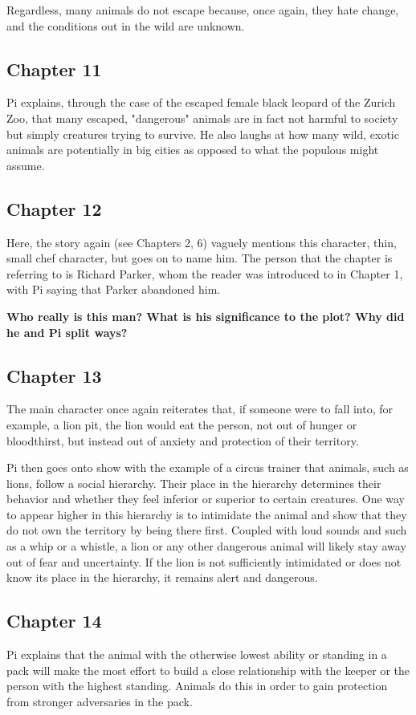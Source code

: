 \documentclass[11pt]{article}
\begin{document}
Regardless, many animals do not escape because, once again, they hate change, and the conditions out in the wild are unknown.
\subsection{Chapter 11}
\label{sec:org6f41b4b}
Pi explains, through the case of the escaped female black leopard of the Zurich Zoo, that many escaped, "dangerous" animals are in fact not harmful to society but simply creatures trying to survive. He also laughs at how many wild, exotic animals are potentially in big cities as opposed to what the populous might assume.
\subsection{Chapter 12}
\label{sec:orge7b649f}
Here, the story again (see Chapters 2, 6) vaguely mentions this character, thin, small chef character, but goes on to name him. The person that the chapter is referring to is Richard Parker, whom the reader was introduced to in Chapter 1, with Pi saying that Parker abandoned him.

\textbf{Who really is this man? What is his significance to the plot? Why did he and Pi split ways?}
\subsection{Chapter 13}
\label{sec:org1650b41}
The main character once again reiterates that, if someone were to fall into, for example, a lion pit, the lion would eat the person, not out of hunger or bloodthirst, but instead out of anxiety and protection of their territory.

Pi then goes onto show with the example of a circus trainer that animals, such as lions, follow a social hierarchy. Their place in the hierarchy determines their behavior and whether they feel inferior or superior to certain creatures. One way to appear higher in this hierarchy is to intimidate the animal and show that they do not own the territory by being there first. Coupled with loud sounds and such as a whip or a whistle, a lion or any other dangerous animal will likely stay away out of fear and uncertainty. If the lion is not sufficiently intimidated or does not know its place in the hierarchy, it remains alert and dangerous.
\subsection{Chapter 14}
\label{sec:org483700e}
Pi explains that the animal with the otherwise lowest ability or standing in a pack will make the most effort to build a close relationship with the keeper or the person with the highest standing. Animals do this in order to gain protection from stronger adversaries in the pack.
\end{document}
